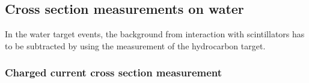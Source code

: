 

\subsection{Cross section measurements on water}
In the water target events, the background from interaction with scintillators has to be subtracted by using the measurement of the hydrocarbon target.


\subsubsection{Charged current cross section measurement}



